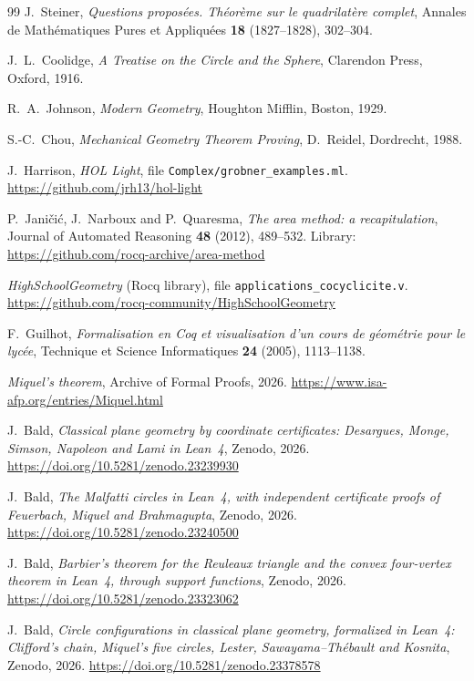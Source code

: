\documentclass[11pt]{article}
\theoremstyle{definition}
\theoremstyle{remark}
\begin{document}
\begin{thebibliography}{99}
J.~Steiner,
\emph{Questions propos\'ees. Th\'eor\`eme sur le quadrilat\`ere complet},
Annales de Math\'ematiques Pures et Appliqu\'ees \textbf{18} (1827--1828), 302--304.

J.~L.~Coolidge,
\emph{A Treatise on the Circle and the Sphere},
Clarendon Press, Oxford, 1916.

R.~A.~Johnson,
\emph{Modern Geometry},
Houghton Mifflin, Boston, 1929.

S.-C.~Chou,
\emph{Mechanical Geometry Theorem Proving},
D.~Reidel, Dordrecht, 1988.

J.~Harrison, \emph{HOL Light}, file \texttt{Complex/grobner\_examples.ml}.
\url{https://github.com/jrh13/hol-light}

P.~Jani\v{c}i\'c, J.~Narboux and P.~Quaresma,
\emph{The area method: a recapitulation},
Journal of Automated Reasoning \textbf{48} (2012), 489--532. Library: \url{https://github.com/rocq-archive/area-method}

\emph{HighSchoolGeometry} (Rocq library), file \texttt{applications\_cocyclicite.v}.
\url{https://github.com/rocq-community/HighSchoolGeometry}

F.~Guilhot,
\emph{Formalisation en Coq et visualisation d'un cours de g\'eom\'etrie pour le lyc\'ee},
Technique et Science Informatiques \textbf{24} (2005), 1113--1138.

\emph{Miquel's theorem}, Archive of Formal Proofs, 2026.
\url{https://www.isa-afp.org/entries/Miquel.html}

J.~Bald,
\emph{Classical plane geometry by coordinate certificates: Desargues, Monge, Simson, Napoleon and Lami in Lean~4},
Zenodo, 2026. \url{https://doi.org/10.5281/zenodo.23239930}

J.~Bald,
\emph{The Malfatti circles in Lean~4, with independent certificate proofs of Feuerbach, Miquel and Brahmagupta},
Zenodo, 2026. \url{https://doi.org/10.5281/zenodo.23240500}

J.~Bald,
\emph{Barbier's theorem for the Reuleaux triangle and the convex four-vertex theorem in Lean~4, through support functions},
Zenodo, 2026. \url{https://doi.org/10.5281/zenodo.23323062}

J.~Bald,
\emph{Circle configurations in classical plane geometry, formalized in Lean~4: Clifford's chain, Miquel's five circles, Lester, Sawayama--Th\'ebault and Kosnita},
Zenodo, 2026. \url{https://doi.org/10.5281/zenodo.23378578}
\end{thebibliography}
\end{document}
